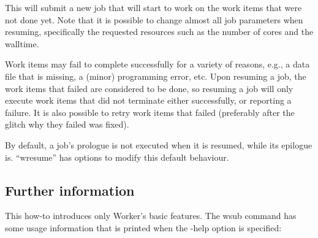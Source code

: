 \begin{prompt}
\end{prompt}

This will submit a new job that will start to work on the work items that were
not done yet. Note that it is possible to change almost all job parameters when
resuming, specifically the requested resources such as the number of cores and
the walltime.

\begin{prompt}
\end{prompt}

Work items may fail to complete successfully for a variety of reasons, e.g., a
data file that is missing, a (minor) programming error, etc. Upon resuming a
job, the work items that failed are considered to be done, so resuming a job
will only execute work items that did not terminate either successfully, or
reporting a failure. It is also possible to retry work items that failed
(preferably after the glitch why they failed was fixed).

\begin{prompt}
\end{prompt}

By default, a job's prologue is not executed when it is resumed, while its
epilogue is. ``wresume'' has options to modify this default behaviour.

\subsection{Further information}

This how-to introduces only Worker's basic features. The wsub command has some
usage information that is printed when the -help option is specified:

